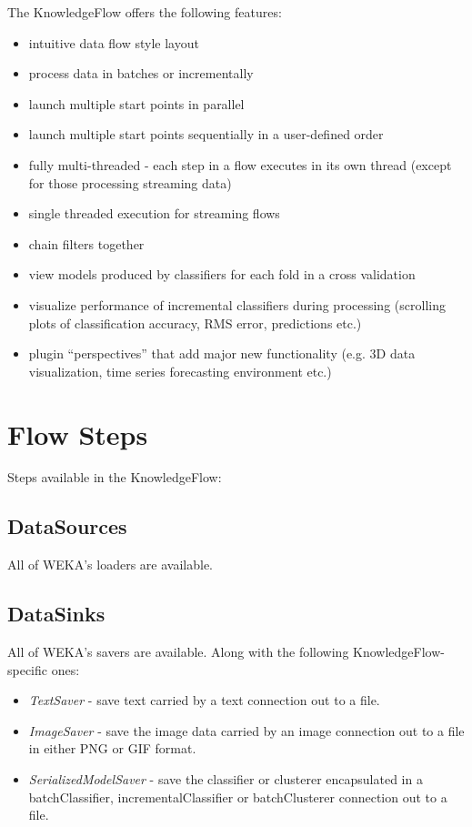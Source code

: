 The KnowledgeFlow offers the following features:
\begin{itemize}
	\item intuitive data flow style layout
	\item process data in batches or incrementally 
	\item launch multiple start points in parallel
        \item launch multiple start points sequentially in a user-defined order
        \item fully multi-threaded - each step in a flow executes in its own thread (except for those processing streaming data)
        \item single threaded execution for streaming flows
	\item chain filters together
	\item view models produced by classifiers for each fold in a cross validation
	\item visualize performance of incremental classifiers during 
  	processing (scrolling plots of classification accuracy, RMS error, 
  	predictions etc.)
        \item plugin ``perspectives'' that add major new functionality (e.g. 3D data visualization, 
          time series forecasting environment etc.)
\end{itemize}

\newpage
\section{Flow Steps}
Steps available in the KnowledgeFlow:

\subsection{DataSources} All of WEKA's loaders are available.

\subsection{DataSinks} All of WEKA's savers are available. Along with the
following KnowledgeFlow-specific ones:

\begin{itemize}  
\item \textit{TextSaver} - save text carried by a text connection out to a file.
\item \textit{ImageSaver} - save the image data carried by an image connection
out to a file in either PNG or GIF format.
\item \textit{SerializedModelSaver} - save the classifier or clusterer
  encapsulated in a batchClassifier, incrementalClassifier or batchClusterer
  connection out to a file.
\end{itemize}

